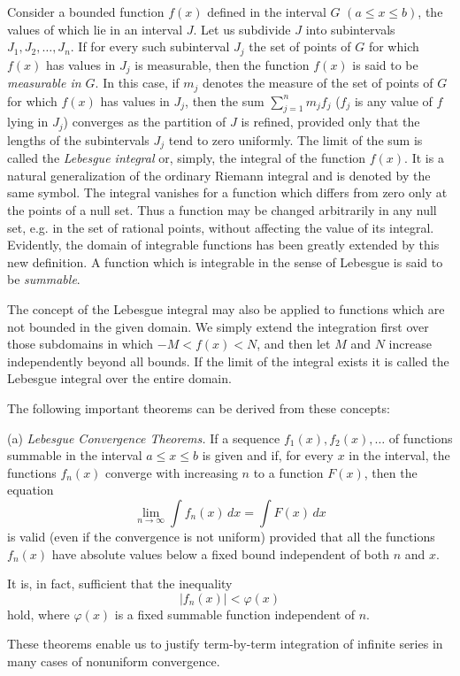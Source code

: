 Consider a bounded function $f(x)$ defined in the interval $G$ $(a\le x\le b)$, the values of which lie in an interval $J$. Let us subdivide $J$ into subintervals $J_1,J_2,\ldots,J_n$. If for every such subinterval $J_j$ the set of points of $G$ for which $f(x)$ has values in $J_j$ is measurable, then the function $f(x)$ is said to be \emph{measurable in $G$}. In this case, if $m_j$ denotes the measure of the set of points of $G$ for which $f(x)$ has values in $J_j$, then the sum $\sum_{j=1}^n m_jf_j$ ($f_j$ is any value of $f$ lying in $J_j$) converges as the partition of $J$ is refined, provided only that the lengths of the subintervals $J_j$ tend to zero uniformly. The limit of the sum is called the \emph{Lebesgue integral} or, simply, the integral of the function $f(x)$. It is a natural generalization of the ordinary Riemann integral and is denoted by the same symbol. The integral vanishes for a function which differs from zero only at the points of a null set. Thus a function may be changed arbitrarily in any null set, e.g. in the set of rational points, without affecting the value of its integral. Evidently, the domain of integrable functions has been greatly extended by this new definition. A function which is integrable in the sense of Lebesgue is said to be \emph{summable}.

The concept of the Lebesgue integral may also be applied to functions which are not bounded in the given domain. We simply extend the integration first over those subdomains in which $-M<f(x)<N$, and then let $M$ and $N$ increase independently beyond all bounds. If the limit of the integral exists it is called the Lebesgue integral over the entire domain.

The following important theorems can be derived from these concepts:

(a) \emph{Lebesgue Convergence Theorems.} If a sequence $f_1(x),f_2(x),\ldots$ of functions summable in the interval $a\le x\le b$ is given and if, for every $x$ in the interval, the functions $f_n(x)$ converge with increasing $n$ to a function $F(x)$, then the equation
\[
\lim_{n\to\infty}\int f_n(x)\,dx=\int F(x)\,dx
\]
is valid (even if the convergence is not uniform) provided that all the functions $f_n(x)$ have absolute values below a fixed bound independent of both $n$ and $x$.

It is, in fact, sufficient that the inequality
\[
|f_n(x)|<\varphi(x)
\]
hold, where $\varphi(x)$ is a fixed summable function independent of $n$.

These theorems enable us to justify term-by-term integration of infinite series in many cases of nonuniform convergence.

